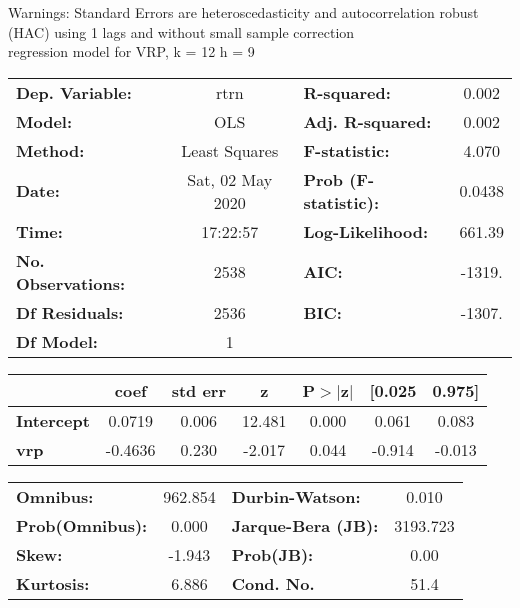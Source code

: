 Warnings: \newline
 [1] Standard Errors are heteroscedasticity and autocorrelation robust (HAC) using 1 lags and without small sample correction\\ 

regression model for VRP, k = 12 h = 9\begin{center}
\begin{tabular}{lclc}
\toprule
\textbf{Dep. Variable:}    &       rtrn       & \textbf{  R-squared:         } &     0.002   \\
\textbf{Model:}            &       OLS        & \textbf{  Adj. R-squared:    } &     0.002   \\
\textbf{Method:}           &  Least Squares   & \textbf{  F-statistic:       } &     4.070   \\
\textbf{Date:}             & Sat, 02 May 2020 & \textbf{  Prob (F-statistic):} &   0.0438    \\
\textbf{Time:}             &     17:22:57     & \textbf{  Log-Likelihood:    } &    661.39   \\
\textbf{No. Observations:} &        2538      & \textbf{  AIC:               } &    -1319.   \\
\textbf{Df Residuals:}     &        2536      & \textbf{  BIC:               } &    -1307.   \\
\textbf{Df Model:}         &           1      & \textbf{                     } &             \\
\bottomrule
\end{tabular}
\begin{tabular}{lcccccc}
                   & \textbf{coef} & \textbf{std err} & \textbf{z} & \textbf{P$> |$z$|$} & \textbf{[0.025} & \textbf{0.975]}  \\
\midrule
\textbf{Intercept} &       0.0719  &        0.006     &    12.481  &         0.000        &        0.061    &        0.083     \\
\textbf{vrp}       &      -0.4636  &        0.230     &    -2.017  &         0.044        &       -0.914    &       -0.013     \\
\bottomrule
\end{tabular}
\begin{tabular}{lclc}
\textbf{Omnibus:}       & 962.854 & \textbf{  Durbin-Watson:     } &    0.010  \\
\textbf{Prob(Omnibus):} &   0.000 & \textbf{  Jarque-Bera (JB):  } & 3193.723  \\
\textbf{Skew:}          &  -1.943 & \textbf{  Prob(JB):          } &     0.00  \\
\textbf{Kurtosis:}      &   6.886 & \textbf{  Cond. No.          } &     51.4  \\
\bottomrule
\end{tabular}
\end{center}

